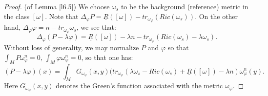 \documentclass[11pt]{amsart}
\numberwithin{equation}{section}
\begin{document}
\begin{proof}
(of Lemma \ref{l6.5}) We choose $\omega_s$ to be the background (reference) metric in the class $[\omega]$. 
Note that $\Delta_{\varphi}P=\underline{R}([\omega])-tr_{\omega_{\varphi}}(Ric(\omega_s))$.  On the other hand,  $\Delta_{\varphi}\varphi=n-tr_{\omega_{\varphi}}\omega_s$,  we see that:
\begin{equation*}
\Delta_{\varphi}(P-\lambda\varphi)=\underline{R}([\omega])-\lambda n-tr_{\omega_{\varphi}}(Ric(\omega_s)-\lambda \omega_s).
\end{equation*}
Without loss of generality,  we may normalize $P$ and $\varphi$ so that $\int_MP\omega_{\varphi}^n=0,\,\int_M\varphi\omega_{\varphi}^n=0$,  so that one has:
\begin{equation*}
(P-\lambda\varphi)(x)=\int_MG_{\omega_{\varphi}}(x,y)\big(tr_{\omega_{\varphi}}(\lambda\omega_s-Ric(\omega_s)+\underline{R}([\omega])-\lambda n)\omega_{\varphi}^n(y).
\end{equation*}
Here $G_{\omega_{\varphi}}(x,y)$ denotes the Green's function associated with the metric $\omega_{\varphi}$.  


\end{proof}
\end{document}
